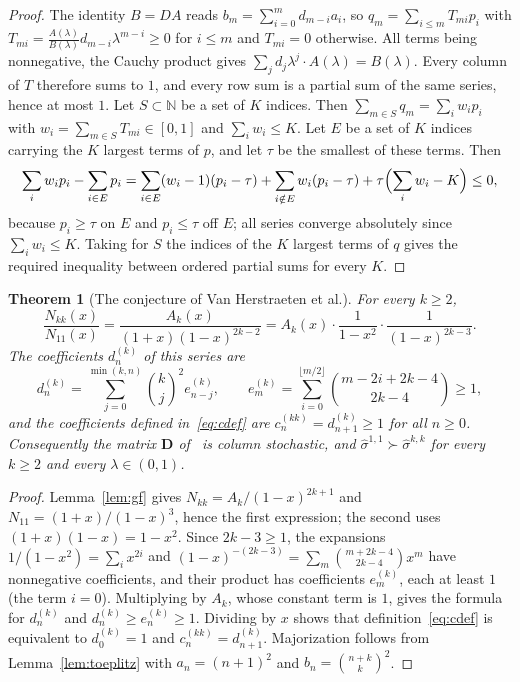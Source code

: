 \documentclass[11pt,a4paper]{article}
\newtheorem{theorem}{Theorem}
\theoremstyle{definition}
\theoremstyle{plain}
\newcommand{\N}{\mathbb{N}}
\newcommand{\sig}[2]{\hat\sigma^{#1,#2}}
\begin{document}
\begin{proof}
The identity $B=DA$ reads $b_m=\sum_{i=0}^m d_{m-i}a_i$, so
$q_m=\sum_{i\le m}T_{mi}p_i$ with $T_{mi}=\frac{A(\lambda)}{B(\lambda)}d_{m-i}\lambda^{m-i}\ge0$
for $i\le m$ and $T_{mi}=0$ otherwise. All terms being nonnegative, the Cauchy
product gives $\sum_jd_j\lambda^j\cdot A(\lambda)=B(\lambda)$. Every column of $T$
therefore sums to $1$, and every row sum is a partial sum of the same series,
hence at most $1$. Let $S\subset\N$ be a set of $K$ indices. Then
$\sum_{m\in S}q_m=\sum_iw_ip_i$ with $w_i=\sum_{m\in S}T_{mi}\in[0,1]$ and
$\sum_iw_i\le K$. Let $E$ be a set of $K$ indices carrying the $K$ largest terms
of $p$, and let $\tau$ be the smallest of these terms. Then
\[
\sum_iw_ip_i-\sum_{i\in E}p_i
=\sum_{i\in E}(w_i-1)(p_i-\tau)+\sum_{i\notin E}w_i(p_i-\tau)
+\tau\Bigl(\sum_iw_i-K\Bigr)\le0,
\]
because $p_i\ge\tau$ on $E$ and $p_i\le\tau$ off $E$; all series converge
absolutely since $\sum_iw_i\le K$. Taking for $S$ the indices of the $K$ largest
terms of $q$ gives the required inequality between ordered partial sums for every
$K$.
\end{proof}

\begin{theorem}[The conjecture of Van Herstraeten et al.]\label{thm:main}
For every $k\ge2$,
\[
\frac{N_{kk}(x)}{N_{11}(x)}=\frac{A_k(x)}{(1+x)(1-x)^{2k-2}}
=A_k(x)\cdot\frac{1}{1-x^2}\cdot\frac{1}{(1-x)^{2k-3}} .
\]
The coefficients $d^{(k)}_n$ of this series are
\[
d^{(k)}_n=\sum_{j=0}^{\min(k,n)}\binom kj^2e^{(k)}_{n-j},
\qquad
e^{(k)}_m=\sum_{i=0}^{\lfloor m/2\rfloor}\binom{m-2i+2k-4}{2k-4}\ge1,
\]
and the coefficients defined in~\eqref{eq:cdef} are $c^{(kk)}_n=d^{(k)}_{n+1}\ge1$
for all $n\ge0$. Consequently the matrix $\mathbf D$ of~\cite{VanHerstraeten2024}
is column stochastic, and $\sig11\succ\sig kk$ for every $k\ge2$ and every
$\lambda\in(0,1)$.
\end{theorem}

\begin{proof}
Lemma~\ref{lem:gf} gives $N_{kk}=A_k/(1-x)^{2k+1}$ and $N_{11}=(1+x)/(1-x)^3$,
hence the first expression; the second uses $(1+x)(1-x)=1-x^2$. Since
$2k-3\ge1$, the expansions $1/(1-x^2)=\sum_ix^{2i}$ and
$(1-x)^{-(2k-3)}=\sum_m\binom{m+2k-4}{2k-4}x^m$ have nonnegative coefficients,
and their product has coefficients $e^{(k)}_m$, each at least $1$ (the term
$i=0$). Multiplying by $A_k$, whose constant term is $1$, gives the formula for
$d^{(k)}_n$ and $d^{(k)}_n\ge e^{(k)}_n\ge1$. Dividing by $x$ shows that
definition~\eqref{eq:cdef} is equivalent to $d^{(k)}_0=1$ and
$c^{(kk)}_n=d^{(k)}_{n+1}$. Majorization follows from
Lemma~\ref{lem:toeplitz} with $a_n=(n+1)^2$ and $b_n=\binom{n+k}{k}^2$.
\end{proof}
\end{document}
